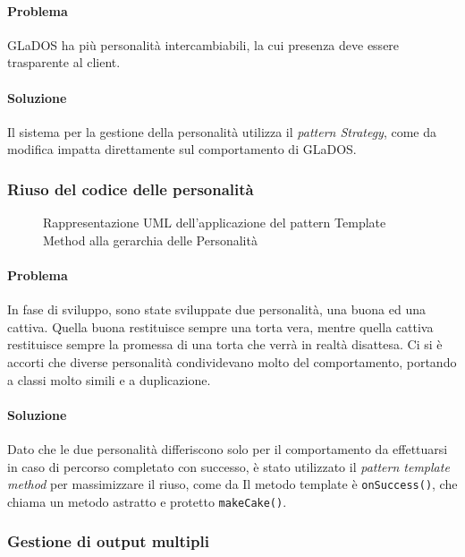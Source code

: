 \documentclass[a4paper,12pt]{report}
\begin{document}
\paragraph{Problema} GLaDOS ha più personalità intercambiabili, la cui presenza deve essere trasparente al client.

\paragraph{Soluzione} Il sistema per la gestione della personalità utilizza il \textit{pattern Strategy}, come da
modifica impatta direttamente sul comportamento di GLaDOS.

\subsubsection{Riuso del codice delle personalità}

\begin{figure}[H]
\centering{}
\caption{Rappresentazione UML dell'applicazione del pattern Template Method alla gerarchia delle Personalità}
\label{img:template}
\end{figure}

\paragraph{Problema} In fase di sviluppo, sono state sviluppate due personalità, una buona ed una cattiva.
Quella buona restituisce sempre una torta vera, mentre quella cattiva restituisce sempre la
promessa di una torta che verrà in realtà disattesa.
Ci si è accorti che diverse personalità condividevano molto del comportamento,
portando a classi molto simili e a duplicazione.

\paragraph{Soluzione} Dato che le due personalità differiscono solo per il comportamento da effettuarsi in caso di percorso completato con successo,
è stato utilizzato il \textit{pattern template method} per massimizzare il riuso, come da %
Il metodo template è \texttt{onSuccess()}, che chiama un metodo astratto e protetto
\texttt{makeCake()}.

\subsubsection{Gestione di output multipli}
\end{document}

